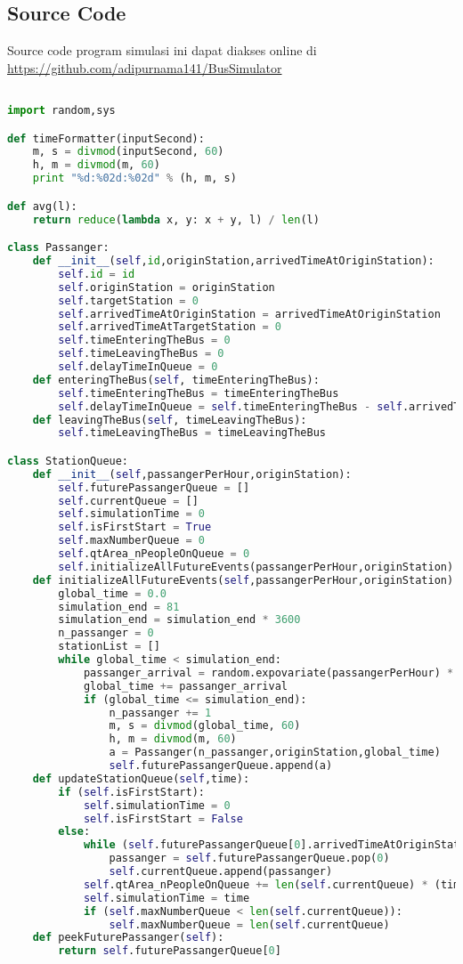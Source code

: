 \documentclass{article}
\begin{document}
\subsection{Source Code} 
Source code program simulasi ini dapat diakses online di \url{https://github.com/adipurnama141/BusSimulator}

\begin{lstlisting}[language=Python]

import random,sys

def timeFormatter(inputSecond):
	m, s = divmod(inputSecond, 60)
	h, m = divmod(m, 60)
	print "%d:%02d:%02d" % (h, m, s)

def avg(l):
	return reduce(lambda x, y: x + y, l) / len(l)

class Passanger:
	def __init__(self,id,originStation,arrivedTimeAtOriginStation):
		self.id = id
		self.originStation = originStation
		self.targetStation = 0
		self.arrivedTimeAtOriginStation = arrivedTimeAtOriginStation
		self.arrivedTimeAtTargetStation = 0
		self.timeEnteringTheBus = 0
		self.timeLeavingTheBus = 0
		self.delayTimeInQueue = 0
	def enteringTheBus(self, timeEnteringTheBus):
		self.timeEnteringTheBus = timeEnteringTheBus
		self.delayTimeInQueue = self.timeEnteringTheBus - self.arrivedTimeAtOriginStation
	def leavingTheBus(self, timeLeavingTheBus):
		self.timeLeavingTheBus = timeLeavingTheBus

class StationQueue:
	def __init__(self,passangerPerHour,originStation):
		self.futurePassangerQueue = []
		self.currentQueue = []
		self.simulationTime = 0
		self.isFirstStart = True
		self.maxNumberQueue = 0
		self.qtArea_nPeopleOnQueue = 0
		self.initializeAllFutureEvents(passangerPerHour,originStation)
	def initializeAllFutureEvents(self,passangerPerHour,originStation):
		global_time = 0.0
		simulation_end = 81
		simulation_end = simulation_end * 3600
		n_passanger = 0
		stationList = []
		while global_time < simulation_end:
			passanger_arrival = random.expovariate(passangerPerHour) * 3600
			global_time += passanger_arrival
			if (global_time <= simulation_end):
				n_passanger += 1
				m, s = divmod(global_time, 60)
				h, m = divmod(m, 60)
				a = Passanger(n_passanger,originStation,global_time)
				self.futurePassangerQueue.append(a)
	def updateStationQueue(self,time):
		if (self.isFirstStart):
			self.simulationTime = 0
			self.isFirstStart = False
		else:
			while (self.futurePassangerQueue[0].arrivedTimeAtOriginStation <= time):
				passanger = self.futurePassangerQueue.pop(0)
				self.currentQueue.append(passanger)
			self.qtArea_nPeopleOnQueue += len(self.currentQueue) * (time - self.simulationTime)
			self.simulationTime = time
			if (self.maxNumberQueue < len(self.currentQueue)):
				self.maxNumberQueue = len(self.currentQueue)
	def peekFuturePassanger(self):
		return self.futurePassangerQueue[0]



\end{lstlisting}
\end{document}
